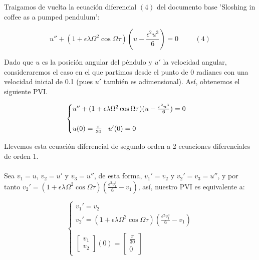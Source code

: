 \documentclass{article}
\begin{document}
Traigamos de vuelta la ecuación diferencial $(4)$ del documento base 'Sloshing in coffee as a pumped pendulum':

\[
u''+(1+\epsilon\lambda\Omega^{2}\cos{\Omega\tau})(u-\frac{\epsilon^2u^3}{6})=0 \hspace{1cm}(4)
\]

Dado que $u$ es la posición angular del péndulo y $u'$ la velocidad angular, consideraremos el caso en el que partimos desde el punto de 0 radianes con una velocidad inicial de 0.1 (pues $u'$ también es adimensional). Así, obtenemos el siguiente PVI.

\[
\begin{cases}
    u''+(1+\epsilon\lambda\Omega^{2}\cos{\Omega\tau})(u-\frac{\epsilon^2u^3}{6})=0\\ \\
    u(0)=\frac{\pi}{30}\hspace{0.3cm}u'(0)=0
\end{cases}
\]

Llevemos esta ecuación diferencial de segundo orden a 2 ecuaciones diferenciales de orden 1.\\
\\
Sea $v_1=u$, $v_2=u'$ y $v_3=u''$, de esta forma, $v_1'=v_2$ y $v_2'=v_3=u''$, y por tanto $v_2'=(1+\epsilon\lambda\Omega^{2}\cos{\Omega\tau})(\frac{\epsilon^2v_1^3}{6}-v_1)$, así, nuestro PVI es equivalente a:

\[
\begin{cases}
v_1'=v_2\\
v_2'=(1+\epsilon\lambda\Omega^{2}\cos{\Omega\tau})(\frac{\epsilon^2v_1^3}{6}-v_1)\\ \\
\begin{bmatrix}
    v_1\\
    v_2
\end{bmatrix}
(0)=
\begin{bmatrix}
    \frac{\pi}{30}\\
    0
\end{bmatrix}
\end{cases}
\]
\end{document}
